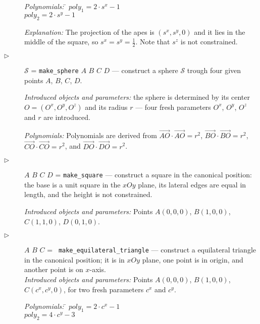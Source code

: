 \documentclass{article}
\begin{document}
\begin{description}
 \begin{tabbing}
 {\em Polynomials:} \= $poly_1 = 2\cdot s^x - 1$ \\
                    \> $poly_2 = 2\cdot s^y - 1$
 \end{tabbing}

 {\em Explanation:} The projection of the apes is $(s^x, s^y, 0)$ and
 it lies in the middle of the square, so $s^x = s^y =
 \frac{1}{2}$. Note that $s^z$ is not constrained.

\item[$\triangleright$] $\mathcal{S}$ = {\tt make\_sphere} $A$ $B$ $C$
  $D$ --- construct a sphere $\mathcal{S}$ trough four given points
  $A$, $B$, $C$, $D$.
  
 {\em Introduced objects and parameters:} the sphere is determined by
 its center $O = (O^x, O^y, O^z)$ and its radius $r$ --- four fresh
 parameters $O^x$, $O^y$, $O^z$ and $r$ are introduced.

{\em Polynomials:} Polynomials are derived from
$\overrightarrow{AO}\cdot\overrightarrow{AO} = r^2$,
$\overrightarrow{BO}\cdot\overrightarrow{BO} = r^2$,
$\overrightarrow{CO}\cdot\overrightarrow{CO} = r^2$, and
$\overrightarrow{DO}\cdot\overrightarrow{DO} = r^2$.

 \item[$\triangleright$] $A$ $B$ $C$ $D$ = {\tt make\_square} ---
   construct a square in the canonical position: the base is a unit
   square in the $xOy$ plane, its lateral edges are equal in length,
   and the height is not constrained.

   {\em Introduced objects and parameters:} Points $A(0, 0, 0)$,
   $B(1, 0, 0)$, $C(1, 1, 0)$, $D(0, 1, 0)$.

 \item[$\triangleright$] $A$ $B$ $C$ = {\tt
     make\_equilateral\_triangle} --- construct a equilateral triangle
   in the canonical position; it is in $xOy$ plane, one point is in
   origin, and another point is on
   $x$-axis. \\
   {\em Introduced objects and parameters:} Points $A(0, 0, 0)$,
   $B(1, 0, 0)$, $C(c^x, c^y, 0)$, for two fresh parameters $c^x$ and
   $c^y$.

 \begin{tabbing}
 {\em Polynomials:} \= $poly_1 = 2\cdot c^x - 1$ \\
                    \> $poly_2 = 4\cdot c^y - 3$
 \end{tabbing}


\end{description}
\end{document}
